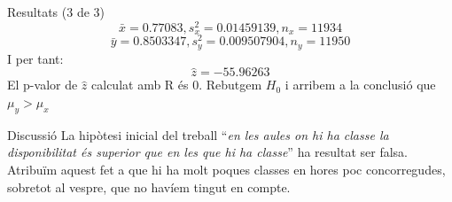 \documentclass[xetex,mathserif,serif]{beamer}
\begin{document}
  \begin{frame}{Resultats (3 de 3)}
    $$\bar{x} = 0.77083, s^2_x = 0.01459139, n_x = 11934$$
    $$\bar{y} = 0.8503347, s^2_y = 0.009507904, n_y = 11950$$
    I per tant:
    $$\hat{z} = -55.96263$$
    El p-valor de $\hat{z}$ calculat amb R és 0. Rebutgem $H_0$ i arribem a la conclusió que $\mu_y > \mu_x$
  \end{frame}
  
  \begin{frame}{Discussió}
    La hipòtesi inicial del treball ``\emph{en les aules on hi ha classe la disponibilitat és superior que en les que hi ha classe}'' ha resultat ser falsa. \\
    Atribuïm aquest fet a que hi ha molt poques classes en hores poc concorregudes, sobretot al vespre, que no havíem tingut en compte.
  \end{frame}
\end{document}
